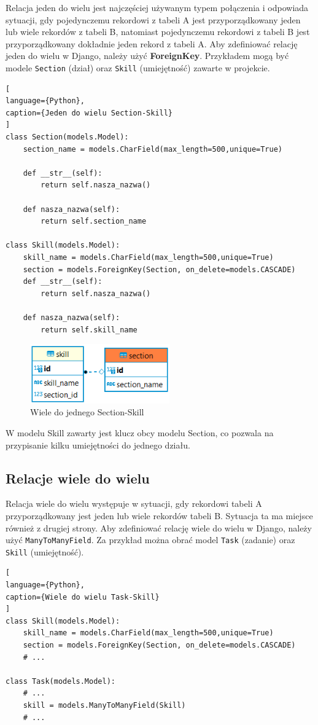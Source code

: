 \documentclass[oneside,polski,logo,indent]{amuthesis}
\begin{document}
Relacja jeden do wielu jest najczęściej używanym typem połączenia i odpowiada sytuacji, gdy pojedynczemu rekordowi z tabeli A jest przyporządkowany jeden lub wiele rekordów z tabeli B, natomiast pojedynczemu rekordowi z tabeli B jest przyporządkowany dokładnie jeden rekord z tabeli A.
Aby zdefiniować relację jeden do wielu w Django, należy użyć \textbf{ForeignKey}. Przykładem mogą być modele \texttt{Section} (dział) oraz \texttt{Skill} (umiejętność) zawarte w projekcie.
\begin{lstlisting}[
language={Python},
caption={Jeden do wielu Section-Skill}
]
class Section(models.Model):
    section_name = models.CharField(max_length=500,unique=True)

    def __str__(self):
        return self.nasza_nazwa()

    def nasza_nazwa(self):
        return self.section_name

class Skill(models.Model):
    skill_name = models.CharField(max_length=500,unique=True)
    section = models.ForeignKey(Section, on_delete=models.CASCADE)
    def __str__(self):
        return self.nasza_nazwa()

    def nasza_nazwa(self):
        return self.skill_name
\end{lstlisting}

\begin{figure}[H]
  \centering
  \includegraphics[width=6cm]{skillsec.png}
  \caption{Wiele do jednego Section-Skill}
  \label{obraz-przyklad}
\end{figure}

W modelu Skill zawarty jest klucz obcy modelu Section, co pozwala na przypisanie kilku umiejętności do jednego działu.

\begin{center}
\subsection{Relacje wiele do wielu}
\end{center}
Relacja wiele do wielu występuje w sytuacji, gdy rekordowi tabeli A przyporządkowany jest jeden lub wiele rekordów tabeli B. Sytuacja ta ma miejsce również z drugiej strony.
Aby zdefiniować relację wiele do wielu w Django, należy użyć \texttt{ManyToManyField}. Za przykład można obrać model \texttt{Task} (zadanie) oraz \texttt{Skill} (umiejętność).
\begin{lstlisting}[
language={Python},
caption={Wiele do wielu Task-Skill}
]
class Skill(models.Model):
    skill_name = models.CharField(max_length=500,unique=True)
    section = models.ForeignKey(Section, on_delete=models.CASCADE)
	# ...

class Task(models.Model):
	# ...
    skill = models.ManyToManyField(Skill)
	# ...
\end{lstlisting}
\end{document}
